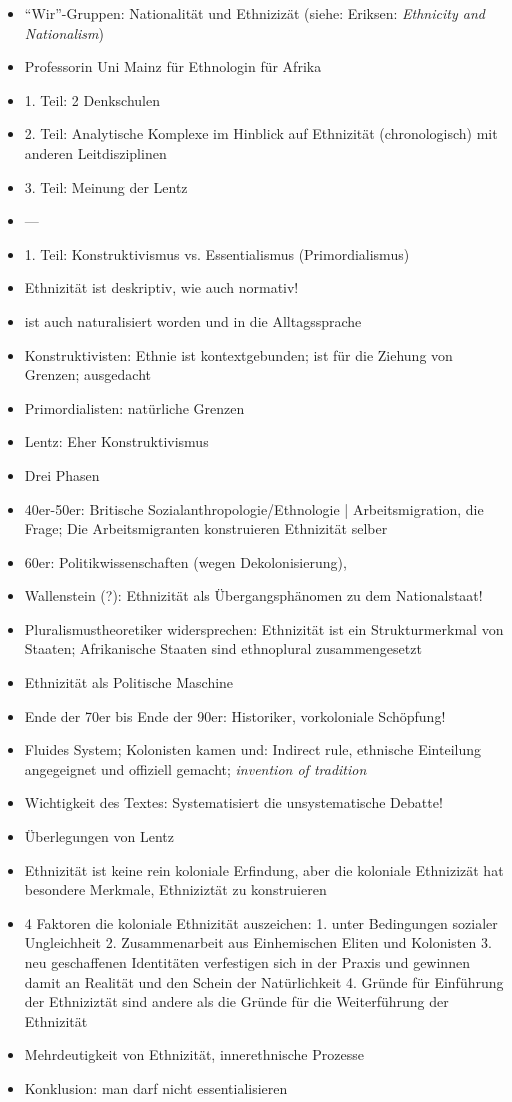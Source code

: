 \documentclass[emulatestandardclasses]{scrartcl}
\begin{document}
\begin{itemize}
  \item "`Wir"'-Gruppen: Nationalität und Ethnizizät (siehe: Eriksen: \emph{Ethnicity and Nationalism})
  \item Professorin Uni Mainz für Ethnologin für Afrika
  \item 1. Teil: 2 Denkschulen
  \item 2. Teil: Analytische Komplexe im Hinblick auf Ethnizität (chronologisch) mit anderen Leitdisziplinen
  \item 3. Teil: Meinung der Lentz
  \item ---
  \item 1. Teil: Konstruktivismus vs. Essentialismus (Primordialismus)
  \item Ethnizität ist deskriptiv, wie auch normativ!
  \item ist auch naturalisiert worden und in die Alltagssprache
  \item Konstruktivisten: Ethnie ist kontextgebunden; ist für die Ziehung von Grenzen; ausgedacht
  \item Primordialisten: natürliche Grenzen
  \item Lentz: Eher Konstruktivismus
  \item Drei Phasen 
  \item 40er-50er: Britische Sozialanthropologie/Ethnologie | Arbeitsmigration, die Frage; Die Arbeitsmigranten konstruieren Ethnizität selber
  \item 60er: Politikwissenschaften (wegen Dekolonisierung), 
  \item Wallenstein (?): Ethnizität als Übergangsphänomen zu dem Nationalstaat!
  \item Pluralismustheoretiker widersprechen: Ethnizität ist ein Strukturmerkmal von Staaten; Afrikanische Staaten sind ethnoplural zusammengesetzt
  \item Ethnizität als Politische Maschine
  \item Ende der 70er bis Ende der 90er: Historiker, vorkoloniale Schöpfung!
  \item Fluides System; Kolonisten kamen und: Indirect rule, ethnische Einteilung angegeignet und offiziell gemacht; \emph{invention of tradition}
  \item Wichtigkeit des Textes: Systematisiert die unsystematische Debatte!
  \item Überlegungen von Lentz
  \item Ethnizität ist keine rein koloniale Erfindung, aber die koloniale Ethnizizät hat besondere Merkmale, Ethniziztät zu konstruieren
  \item 4 Faktoren die koloniale Ethnizität auszeichen: 1. unter Bedingungen sozialer Ungleichheit 2. Zusammenarbeit aus Einhemischen Eliten und Kolonisten 3. neu geschaffenen Identitäten verfestigen sich in der Praxis und gewinnen damit an Realität und den Schein der Natürlichkeit 4. Gründe für Einführung der Ethniziztät sind andere als die Gründe für die Weiterführung der Ethnizität
  \item Mehrdeutigkeit von Ethnizität, innerethnische Prozesse
  \item Konklusion: man darf nicht essentialisieren
\end{itemize}
\end{document}

